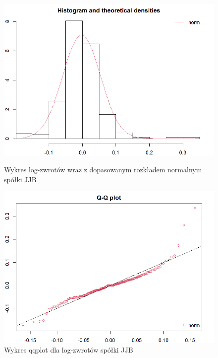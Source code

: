 \documentclass[a4paper,11pt]{article}
\begin{document}
\begin{figure}[!htb]
    \begin{minipage}{0.48\textwidth}
        \centering
        \includegraphics[width=\linewidth]{jjb_histwykres_log.png}
        \caption{Wykres log-zwrotów wraz z dopasowanym rozkładem normalnym spółki JJB}
        \label{fig:jjb_histwykres_log}
    \end{minipage}\hfill
    \begin{minipage}{0.48\textwidth}
        \centering
        \includegraphics[width=\linewidth]{jjb_qqplot_log.png}
        \caption{Wykres qqplot dla log-zwrotów spółki JJB}
        \label{fig:jjb_qqplot_log}
    \end{minipage}
    \vspace{\baselineskip}
    \begin{minipage}{0.48\textwidth}

\end{minipage}
\end{figure}
\end{document}
